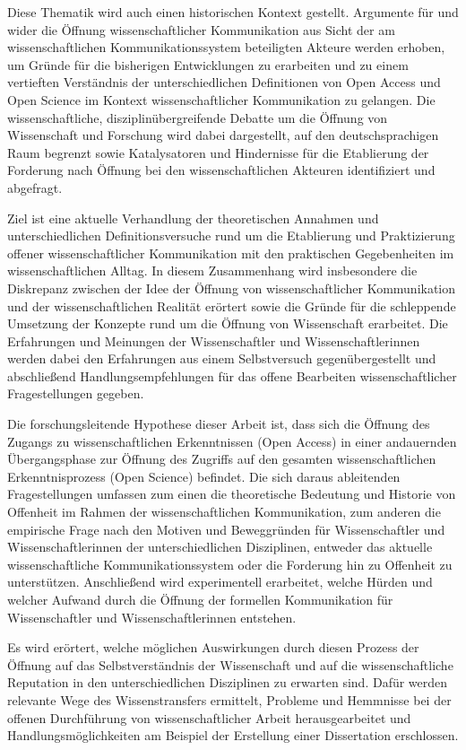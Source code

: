 Diese Thematik wird auch einen historischen Kontext gestellt. Argumente für und wider die Öffnung wissenschaftlicher Kommunikation aus Sicht der am wissenschaftlichen Kommunikationssystem beteiligten Akteure werden erhoben, um Gründe für die bisherigen Entwicklungen zu erarbeiten und zu einem vertieften Verständnis der unterschiedlichen Definitionen von Open Access und Open Science im Kontext wissenschaftlicher Kommunikation zu gelangen. Die wissenschaftliche, disziplinübergreifende Debatte um die Öffnung von Wissenschaft und Forschung wird dabei dargestellt, auf den deutschsprachigen Raum begrenzt sowie Katalysatoren und Hindernisse für die Etablierung der Forderung nach Öffnung bei den wissenschaftlichen Akteuren identifiziert und abgefragt.

Ziel ist eine aktuelle Verhandlung der theoretischen Annahmen und unterschiedlichen Definitionsversuche rund um die Etablierung und Praktizierung offener wissenschaftlicher Kommunikation mit den praktischen Gegebenheiten im wissenschaftlichen Alltag. In diesem Zusammenhang wird insbesondere die Diskrepanz zwischen der Idee der Öffnung von wissenschaftlicher Kommunikation und der wissenschaftlichen Realität \cite{Scheliga_2014} erörtert sowie die Gründe für die schleppende Umsetzung der Konzepte rund um die Öffnung von Wissenschaft erarbeitet. Die Erfahrungen und Meinungen der Wissenschaftler und Wissenschaftlerinnen werden dabei den Erfahrungen aus einem Selbstversuch gegenübergestellt und abschließend Handlungsempfehlungen für das offene Bearbeiten wissenschaftlicher Fragestellungen gegeben.

Die forschungsleitende Hypothese dieser Arbeit ist, dass sich die Öffnung des Zugangs zu wissenschaftlichen Erkenntnissen (Open Access) in einer andauernden Übergangsphase zur Öffnung des Zugriffs auf den gesamten wissenschaftlichen Erkenntnisprozess (Open Science) befindet. Die sich daraus ableitenden Fragestellungen umfassen zum einen die theoretische Bedeutung und Historie von Offenheit im Rahmen der wissenschaftlichen Kommunikation, zum anderen die empirische Frage nach den Motiven und Beweggründen für Wissenschaftler und Wissenschaftlerinnen der unterschiedlichen Disziplinen, entweder das aktuelle wissenschaftliche Kommunikationssystem oder die Forderung hin zu Offenheit zu unterstützen. Anschließend wird experimentell erarbeitet, welche Hürden und welcher Aufwand durch die Öffnung der formellen Kommunikation für Wissenschaftler und Wissenschaftlerinnen entstehen.

Es wird erörtert, welche möglichen Auswirkungen durch diesen Prozess der Öffnung auf das Selbstverständnis der Wissenschaft und auf die wissenschaftliche Reputation in den unterschiedlichen Disziplinen zu erwarten sind. Dafür werden relevante Wege des Wissenstransfers ermittelt, Probleme und Hemmnisse bei der offenen Durchführung von wissenschaftlicher Arbeit herausgearbeitet und Handlungsmöglichkeiten am Beispiel der Erstellung einer Dissertation erschlossen.

